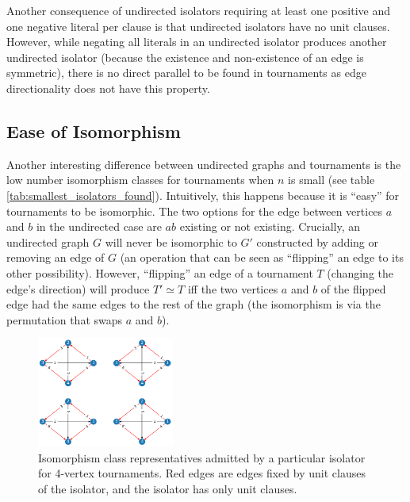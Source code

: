 \documentclass[conference]{IEEEtran}
\begin{document}
Another consequence of undirected isolators requiring at least one positive and one negative literal per clause is that undirected isolators have no unit clauses. However, while negating all literals in an undirected isolator produces another undirected isolator (because the existence and non-existence of an edge is symmetric), there is no direct parallel to be found in tournaments as edge directionality does not have this property.

\subsection{Ease of Isomorphism}
Another interesting difference between undirected graphs and tournaments is the low number isomorphism classes for tournaments when $n$ is small (see table \ref{tab:smallest_isolators_found}). Intuitively, this happens because it is ``easy'' for tournaments to be isomorphic. The two options for the edge between vertices $a$ and $b$ in the undirected case are $ab$ existing or not existing. Crucially, an undirected graph $G$ will never be isomorphic to $G'$ constructed by adding or removing an edge of $G$ (an operation that can be seen as ``flipping'' an edge to its other possibility). However, ``flipping'' an edge of a tournament $T$ (changing the edge's direction) will produce $T' \simeq T$ iff the two vertices $a$ and $b$ of the flipped edge had the same edges to the rest of the graph (the isomorphism is via the permutation that swaps $a$ and $b$).




\begin{figure}
\centering
\includegraphics[width=0.4\textwidth]{iso_4.png}
\caption{Isomorphism class representatives admitted by a particular isolator for 4-vertex tournaments. Red edges are edges fixed by unit clauses of the isolator, and the isolator has only unit clauses.} \label{iso4}
\end{figure}

\end{document}

